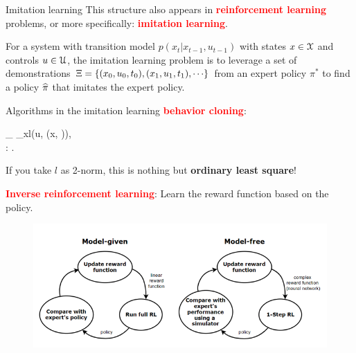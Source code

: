 \documentclass{beamer}
\begin{document}
\begin{frame}{Imitation learning}
	This structure also appears in \textcolor{red}{\textbf{reinforcement learning}} problems, or more specifically: \textcolor{red}{\textbf{imitation learning}}.
	\begin{Def}
		For a system with transition model $p(x_t | x_{t-1}, u_{t-1})$ with states $x \in \mathcal{X}$ and controls $u \in \mathcal{U}$, the imitation learning problem is to
leverage a set of demonstrations $\Xi = \lbb (x_0, u_0, t_0), (x_1, u_1, t_1), \cdots \rbb$ from an expert policy $\pi^*$ to find a
policy $\widehat \pi$ that imitates the expert policy.
	\end{Def}
\end{frame}


\begin{frame}{Algorithms in the imitation learning}
	\textcolor{red}{\textbf{behavior cloning}}: 
	\bequn
		\begin{aligned}
			\arg\min_{\theta} \mbE_{x}l(u, \phi(x, \theta)),		\\
			\phi: \mcX \times \Theta \rightarrow \mcU.
		\end{aligned}
	\eequn
	If you take $l$ as 2-norm, this is nothing but \textbf{ordinary least square}!
	\par
	\textcolor{red}{\textbf{Inverse reinforcement learning}}: 
	Learn the reward function based on the policy.
	\begin{figure}[H]
          \centering
          \centerline{\includegraphics[width=\linewidth]{fig/IRL.png}}
        \end{figure}
\end{frame}
\end{document}
